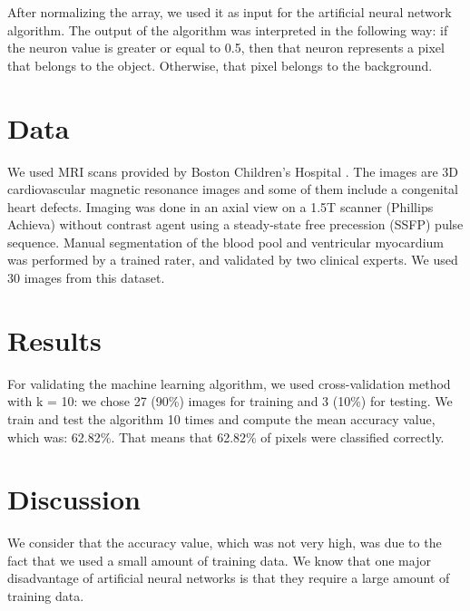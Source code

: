 \documentclass[12pt]{report}
\begin{document}
After normalizing the array, we used it as input for the artificial neural network algorithm. The output of the algorithm was interpreted in the following way: if the neuron value is greater or equal to 0.5, then that neuron represents a pixel that belongs to the object. Otherwise, that pixel belongs to the background. 

\section{Data}
We used MRI scans provided by Boston Children's Hospital \cite{dataSet}. The images are 3D cardiovascular magnetic resonance images and some of them include a congenital heart defects. Imaging was done in an axial view on a 1.5T scanner (Phillips Achieva) without contrast agent using a steady-state free precession (SSFP) pulse sequence. Manual segmentation of the blood pool and ventricular myocardium was performed by a trained rater, and validated by two clinical experts. We used 30 images from this dataset.

\section{Results}
For validating the machine learning algorithm, we used cross-validation method with k = 10: we chose 27 (90\%) images for training and 3 (10\%) for testing. We train and test the algorithm 10 times and compute the mean accuracy value, which was: 62.82\%. That means that 62.82\% of pixels were classified correctly.

\section{Discussion}
We consider that the accuracy value, which was not very high, was due to the fact that we used a small amount of training data. We know that one major disadvantage of artificial neural networks is that they require a large amount of training data.

\printbibliography
\end{document}
